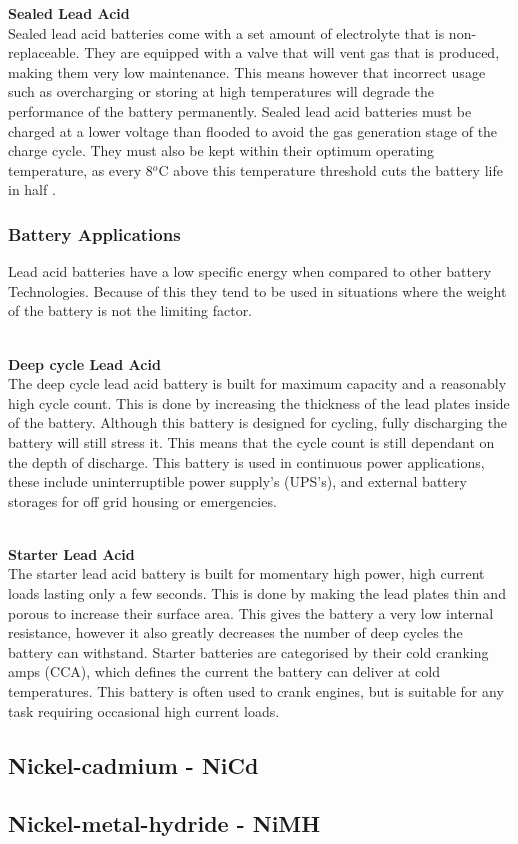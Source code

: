 \documentclass[a4paper,11pt, twocolumn]{article}
\begin{document}
\textbf{Sealed Lead Acid}\\
Sealed lead acid batteries come with a set amount of electrolyte that is non-replaceable. They are equipped with a valve that will vent gas that is produced, making them very low maintenance. This means however that incorrect usage such as overcharging or storing at high temperatures will degrade the performance of the battery permanently. Sealed lead acid batteries must be charged at a lower voltage than flooded to avoid the gas generation stage of the charge cycle. They must also be kept within their optimum operating temperature, as every 8$^o$C above this temperature threshold cuts the battery life in half \cite{lead_acid}.

\subsubsection{Battery Applications}

Lead acid batteries have a low specific energy when compared to other battery Technologies. Because of this they tend to be used in situations where the weight of the battery is not the limiting factor.

\textbf{\\Deep cycle Lead Acid}\\
The deep cycle lead acid battery is built for maximum capacity and a reasonably high cycle count. This is done by increasing the thickness of the lead plates inside of the battery. Although this battery is designed for cycling, fully discharging the battery will still stress it. This means that the cycle count is still dependant on the depth of discharge. This battery is used in continuous power applications, these include uninterruptible power supply’s (UPS’s), and external battery storages for off grid housing or emergencies.

\textbf{\\Starter Lead Acid}\\
The starter lead acid battery is built for momentary high power, high current loads lasting only a few seconds. This is done by making the lead plates thin and porous to increase their surface area. This gives the battery a very low internal resistance, however it also greatly decreases the number of deep cycles the battery can withstand. Starter batteries are categorised by their cold cranking amps (CCA), which defines the current the battery can deliver at cold temperatures. This battery is often used to crank engines, but is suitable for any task requiring occasional high current loads.

\subsection{Nickel-cadmium - NiCd}

\subsection{Nickel-metal-hydride - NiMH}


\newpage
\onecolumn


\end{document}
